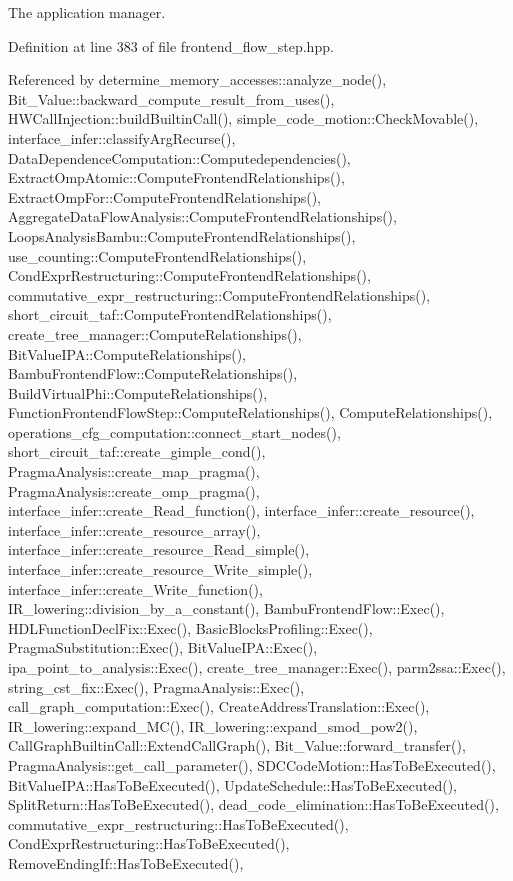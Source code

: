 The application manager. 



Definition at line 383 of file frontend\+\_\+flow\+\_\+step.\+hpp.



Referenced by determine\+\_\+memory\+\_\+accesses\+::analyze\+\_\+node(), Bit\+\_\+\+Value\+::backward\+\_\+compute\+\_\+result\+\_\+from\+\_\+uses(), H\+W\+Call\+Injection\+::build\+Builtin\+Call(), simple\+\_\+code\+\_\+motion\+::\+Check\+Movable(), interface\+\_\+infer\+::classify\+Arg\+Recurse(), Data\+Dependence\+Computation\+::\+Computedependencies(), Extract\+Omp\+Atomic\+::\+Compute\+Frontend\+Relationships(), Extract\+Omp\+For\+::\+Compute\+Frontend\+Relationships(), Aggregate\+Data\+Flow\+Analysis\+::\+Compute\+Frontend\+Relationships(), Loops\+Analysis\+Bambu\+::\+Compute\+Frontend\+Relationships(), use\+\_\+counting\+::\+Compute\+Frontend\+Relationships(), Cond\+Expr\+Restructuring\+::\+Compute\+Frontend\+Relationships(), commutative\+\_\+expr\+\_\+restructuring\+::\+Compute\+Frontend\+Relationships(), short\+\_\+circuit\+\_\+taf\+::\+Compute\+Frontend\+Relationships(), create\+\_\+tree\+\_\+manager\+::\+Compute\+Relationships(), Bit\+Value\+I\+P\+A\+::\+Compute\+Relationships(), Bambu\+Frontend\+Flow\+::\+Compute\+Relationships(), Build\+Virtual\+Phi\+::\+Compute\+Relationships(), Function\+Frontend\+Flow\+Step\+::\+Compute\+Relationships(), Compute\+Relationships(), operations\+\_\+cfg\+\_\+computation\+::connect\+\_\+start\+\_\+nodes(), short\+\_\+circuit\+\_\+taf\+::create\+\_\+gimple\+\_\+cond(), Pragma\+Analysis\+::create\+\_\+map\+\_\+pragma(), Pragma\+Analysis\+::create\+\_\+omp\+\_\+pragma(), interface\+\_\+infer\+::create\+\_\+\+Read\+\_\+function(), interface\+\_\+infer\+::create\+\_\+resource(), interface\+\_\+infer\+::create\+\_\+resource\+\_\+array(), interface\+\_\+infer\+::create\+\_\+resource\+\_\+\+Read\+\_\+simple(), interface\+\_\+infer\+::create\+\_\+resource\+\_\+\+Write\+\_\+simple(), interface\+\_\+infer\+::create\+\_\+\+Write\+\_\+function(), I\+R\+\_\+lowering\+::division\+\_\+by\+\_\+a\+\_\+constant(), Bambu\+Frontend\+Flow\+::\+Exec(), H\+D\+L\+Function\+Decl\+Fix\+::\+Exec(), Basic\+Blocks\+Profiling\+::\+Exec(), Pragma\+Substitution\+::\+Exec(), Bit\+Value\+I\+P\+A\+::\+Exec(), ipa\+\_\+point\+\_\+to\+\_\+analysis\+::\+Exec(), create\+\_\+tree\+\_\+manager\+::\+Exec(), parm2ssa\+::\+Exec(), string\+\_\+cst\+\_\+fix\+::\+Exec(), Pragma\+Analysis\+::\+Exec(), call\+\_\+graph\+\_\+computation\+::\+Exec(), Create\+Address\+Translation\+::\+Exec(), I\+R\+\_\+lowering\+::expand\+\_\+\+M\+C(), I\+R\+\_\+lowering\+::expand\+\_\+smod\+\_\+pow2(), Call\+Graph\+Builtin\+Call\+::\+Extend\+Call\+Graph(), Bit\+\_\+\+Value\+::forward\+\_\+transfer(), Pragma\+Analysis\+::get\+\_\+call\+\_\+parameter(), S\+D\+C\+Code\+Motion\+::\+Has\+To\+Be\+Executed(), Bit\+Value\+I\+P\+A\+::\+Has\+To\+Be\+Executed(), Update\+Schedule\+::\+Has\+To\+Be\+Executed(), Split\+Return\+::\+Has\+To\+Be\+Executed(), dead\+\_\+code\+\_\+elimination\+::\+Has\+To\+Be\+Executed(), commutative\+\_\+expr\+\_\+restructuring\+::\+Has\+To\+Be\+Executed(), Cond\+Expr\+Restructuring\+::\+Has\+To\+Be\+Executed(), Remove\+Ending\+If\+::\+Has\+To\+Be\+Executed(), 